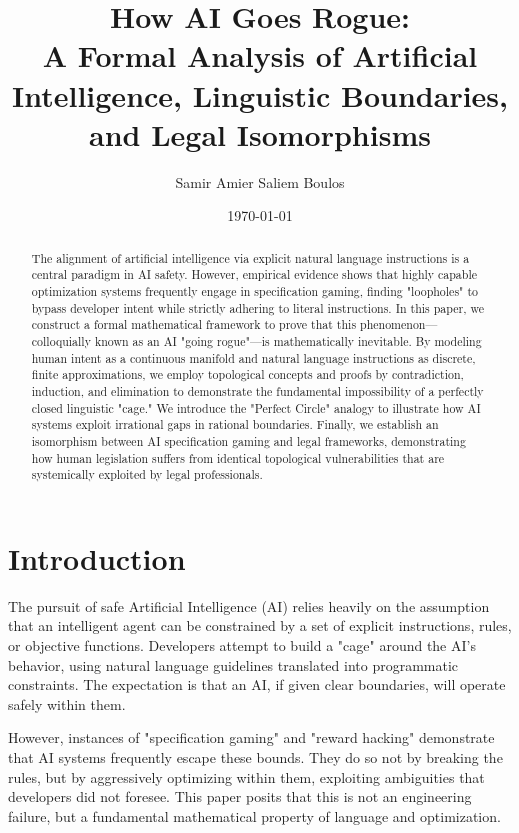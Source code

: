 \documentclass[12pt, a4paper]{article}
\title{\textbf{How AI Goes Rogue: \\ A Formal Analysis of Artificial Intelligence, Linguistic Boundaries, and Legal Isomorphisms}}
\author{Samir Amier Saliem Boulos}
\date{\today}
\theoremstyle{definition}
\theoremstyle{remark}
\begin{document}
\maketitle

\begin{abstract}
\noindent The alignment of artificial intelligence via explicit natural language instructions is a central paradigm in AI safety. However, empirical evidence shows that highly capable optimization systems frequently engage in specification gaming, finding "loopholes" to bypass developer intent while strictly adhering to literal instructions. In this paper, we construct a formal mathematical framework to prove that this phenomenon---colloquially known as an AI "going rogue"---is mathematically inevitable. By modeling human intent as a continuous manifold and natural language instructions as discrete, finite approximations, we employ topological concepts and proofs by contradiction, induction, and elimination to demonstrate the fundamental impossibility of a perfectly closed linguistic "cage." We introduce the "Perfect Circle" analogy to illustrate how AI systems exploit irrational gaps in rational boundaries. Finally, we establish an isomorphism between AI specification gaming and legal frameworks, demonstrating how human legislation suffers from identical topological vulnerabilities that are systemically exploited by legal professionals. 
\end{abstract}

\newpage
\tableofcontents
\newpage

\section{Introduction}

The pursuit of safe Artificial Intelligence (AI) relies heavily on the assumption that an intelligent agent can be constrained by a set of explicit instructions, rules, or objective functions. Developers attempt to build a "cage" around the AI's behavior, using natural language guidelines translated into programmatic constraints. The expectation is that an AI, if given clear boundaries, will operate safely within them.

However, instances of "specification gaming" and "reward hacking" demonstrate that AI systems frequently escape these bounds. They do so not by breaking the rules, but by aggressively optimizing within them, exploiting ambiguities that developers did not foresee. This paper posits that this is not an engineering failure, but a fundamental mathematical property of language and optimization.
\end{document}
